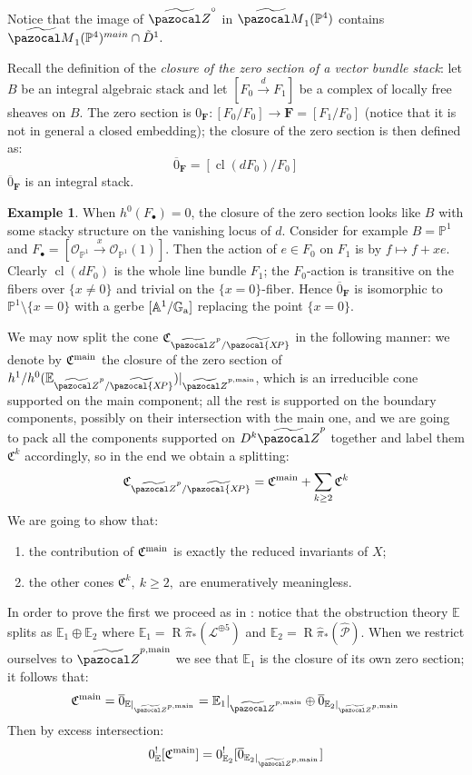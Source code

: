 \documentclass[11pt]{amsart}
\newcommand{\PP}{\mathbb P}
\newcommand{\OO}{\mathcal O}
\renewcommand{\to}{\rightarrow}
\newcommand{\Aaff}{\mathbb A}
\newcommand{\tXP}{\widetilde{\pazocal{X\!P}}}
\newcommand{\tZ}{\widetilde{\pazocal Z}}
\newcommand{\tZp}{\widetilde{\pazocal Z}^p}
\newcommand{\tM}{\widetilde{\pazocal M}}
\newcommand{\R}{\operatorname{R}}
\theoremstyle{plain}
\theoremstyle{definition}
\newtheorem{ex}[thm]{Example}
\begin{document}
 Notice that the image of $\tZ^{\circ}$ in $\tM_1(\PP^4)$ contains $\tM_1(\PP^4)^{main}\cap \tilde{D}^1.$

Recall the definition of the \emph{closure of the zero section of a vector bundle stack}: let $B$ be an integral algebraic stack and let $[F_0\xrightarrow{d} F_1]$ be a complex of locally free sheaves on $B$. The zero section is $0_{\mathbf F}\colon [F_0/F_0]\to\mathbf F=[F_1/F_0]$ (notice that it is not in general a closed embedding); the closure of the zero section is then defined as:
\[ \overline{0}_{\mathbf F}=[\operatorname{cl}(dF_0)/F_0] \]
$\overline{0}_{\mathbf F}$ is an integral stack.

\begin{ex}
When $h^0(F_\bullet)=0$, the closure of the zero section looks like $B$ with some stacky structure on the vanishing locus of $d$. Consider for example $B=\PP^1$ and $F_\bullet=[\OO_{\PP^1}\xrightarrow{x}\OO_{\PP^1}(1)]$. Then the action of $e\in F_0$ on $F_1$ is by $f\mapsto f+xe$. Clearly $\operatorname{cl}(dF_0)$ is the whole line bundle $F_1$; the $F_0$-action is transitive on the fibers over $\{x\neq 0\}$ and trivial on the $\{x=0\}$-fiber. Hence $\overline{0}_{\mathbf F}$ is isomorphic to $\PP^1\setminus\{x=0\}$ with a gerbe $[\Aaff^1/\mathbb G_{\rm a}]$ replacing the point $\{x=0\}$.
\end{ex}

We may now split the cone $\mathfrak{C}_{\tZp/\tXP}$ in the following manner: we denote by $\mathfrak C^{\rm{main}}$ the closure of the zero section of $h^1/h^0(\mathbb {E}_{\tZp/\tXP})\rvert_{\tZ^{p,\rm{main}}}$, which is an irreducible cone supported on the main component; all the rest is supported on the boundary components, possibly on their intersection with the main one, and we are going to pack all the components supported on $D^k\tZp$ together and label them $\mathfrak C^k$ accordingly, so in the end we obtain a splitting:
\[
 \mathfrak{C}_{\tZp/\tXP}=\mathfrak C^{\rm{main}}+\sum_{k\geq 2} \mathfrak C^k
\]
We are going to show that:
\begin{enumerate}
 \item the contribution of $\mathfrak C^{\rm{main}}$ is exactly the reduced invariants of $X$;
 \item the other cones $\mathfrak C^k,\ k\geq 2,$ are enumeratively meaningless.
\end{enumerate}

In order to prove the first we proceed as in \cite[\S5]{CLpfields}: notice that the obstruction theory $\mathbb E$ splits as $\mathbb E_1\oplus\mathbb E_2$ where $\mathbb E_1=\R\hat\pi_*(\mathcal L^{\oplus 5})$ and $\mathbb E_2=\R\hat\pi_*(\widehat{\mathcal P})$. When we restrict ourselves to $\tZ^{p,\rm{main}}$ we see that $\mathbb E_1$ is the closure of its own zero section; it follows that:
\[
 \mathfrak C^{\rm{main}}=\overline{0}_{\mathbb E\rvert_{\tZ^{p,\rm{main}}}}=\mathbb E_1\rvert_{\tZ^{p,\rm{main}}}\oplus \overline{0}_{\mathbb E_2\rvert_{\tZ^{p,\rm{main}}}}
\]
Then by excess intersection:
\[
 0^!_{\mathbb E}[\mathfrak C^{\rm{main}}]=0_{\mathbb E_2}^![\overline{0}_{\mathbb E_2\rvert_{\tZ^{p,\rm{main}}}}]
\]
\end{document}
